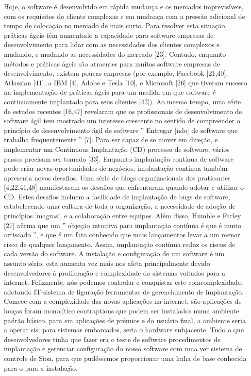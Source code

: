 Hoje, o software é desenvolvido em rápida mudança e os mercados imprevisíveis,
com os requisitos do cliente complexas e em mudança
com a pressão adicional de tempo de colocação no mercado de mais curto. Para
resolver esta
situação, práticas ágeis têm aumentado a capacidade para software
empresas de desenvolvimento para lidar com as necessidades dos clientes complexos
 e mudando, e mudando as necessidades do mercado [23]. Contudo,
enquanto métodos e práticas ágeis são atraentes para muitos software
empresas de desenvolvimento, existem poucas empresas (por exemplo, Facebook
[21,40], Atlassian [41], a IBM [4], Adobe e Tesla [10], e Microsoft
[26] que tiveram sucesso na implementação de práticas ágeis para um
medida em que software é continuamente implantado para seus clientes
[42]). Ao mesmo tempo, uma série de estudos recentes [16,47]
revelaram que os profissionais de desenvolvimento de software ágil tem
mostrado um interesse crescente no sentido de compreender o princípio de
desenvolvimento ágil de software '' Entregar [ndo] de software que trabalha
freqüentemente '' [7].
Para ser capaz de se mover em direção, e implementar um Continuous
Implantação (CD) processo de software, vários passos precisam ser
tomado [33]. Enquanto implantação contínua de software pode criar
novas oportunidades de negócios, implantação contínua também apresenta
novos desafios. Uma série de blogs organizacionais dos praticantes
[4,22,41,48] manifestaram os desafios que enfrentaram quando
adotar e utilizar o CD. Estes desafios incluem a facilidade de
implantação de bugs de software, estabelecendo uma cultura de toda a organização,
a necessidade de adoção de princípios 'magras', e a colaboração entre equipes.
Além disso, Humble e Farley [27] afirma que um '' objeção intuitiva para
implantação contínua é que é muito arriscado '', e que
é um fato conhecido que mais lançamentos levar a um menor risco de qualquer
lançamento. Assim, implantação contínua reduz os riscos de cada
versão do software.
A instalação e configuração de um software é um assunto sério, esta aumenta
vez mais nos afeta principalmente devido desenvolvedores à proliferação e
complexidade do sistemas voltados para a internet. Felizmente, nós podemos
controlar e conquistar este comcomplexidade, adotando IT-sistema de figuração
ferramentas de gerenciamento de implantação. Comece com a complexidade das novas
aplicações na internet, são aplicações de louças foram monolítico contraptions
que podem ser instalados numa ambiente padrão básico. para em aplicações de
prémios e do usuário final, a ambiente seria a operar sis; para sistemas embarcados, seria
o hardware subjacente. Tudo o que desenvolvedores tinha que fazer era o teste de software
procedimentos de implantação e gerenciar configuração do nosso software com uma ver
 sistema de controle de Sion, para que pudéssemos proporcionar uma linha de base
 conhecida para o  para a instalação. \cite{6265084}

